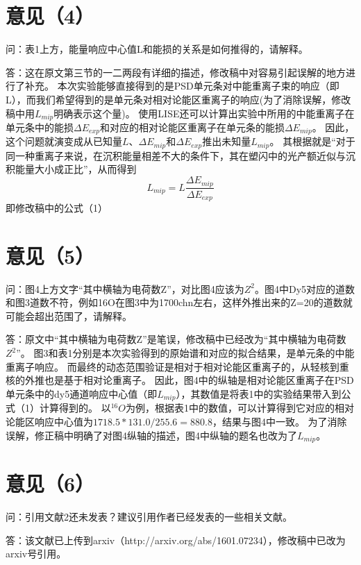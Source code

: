 \documentclass[UTF8]{ctexart}
\begin{document}
\section{意见（4）}
问：表1上方，能量响应中心值L和能损的关系是如何推得的，请解释。

答：这在原文第三节的一二两段有详细的描述，修改稿中对容易引起误解的地方进行了补充。
本次实验能够直接得到的是PSD单元条对中能重离子束的响应（即L），而我们希望得到的是单元条对相对论能区重离子的响应(为了消除误解，修改稿中用$L_{mip}$明确表示这个量)。
使用LISE还可以计算出实验中所用的中能重离子在单元条中的能损$\Delta E_{exp}$和对应的相对论能区重离子在单元条的能损$\Delta E_{mip}$。
因此，这个问题就演变成从已知量$L$、$\Delta E_{mip}$和$\Delta E_{exp}$推出未知量$L_{mip}$。
其根据就是“对于同一种重离子来说，在沉积能量相差不大的条件下，其在塑闪中的光产额近似与沉积能量大小成正比”，从而得到
\begin{equation}
L_{mip}=L\frac{\Delta E_{mip}}{\Delta E_{exp}}
\label{eq:correction}
\end{equation}
即修改稿中的公式（1）

\section{意见（5）}
问：图4上方文字“其中横轴为电荷数Z”，对比图4应该为$Z^2$。图4中Dy5对应的道数和图3道数不符，例如16O在图3中为1700chn左右，这样外推出来的Z=20的道数就可能会超出范围了，请解释。

答：原文中“其中横轴为电荷数Z”是笔误，修改稿中已经改为“其中横轴为电荷数$Z^2$”。
图3和表1分别是本次实验得到的原始谱和对应的拟合结果，是单元条的中能重离子响应。
而最终的动态范围验证是相对于相对论能区重离子的，从轻核到重核的外推也是基于相对论重离子。
因此，图4中的纵轴是相对论能区重离子在PSD单元条中的dy5通道响应中心值（即$L_{mip}$），其数值是将表1中的实验结果带入到公式（1）计算得到的。
以$^{16}O$为例，根据表1中的数值，可以计算得到它对应的相对论能区响应中心值为$1718.5*131.0/255.6=880.8$，结果与图4中一致。
为了消除误解，修正稿中明确了对图4纵轴的描述，图4中纵轴的题名也改为了$L_{mip}$。

\section{意见（6）}
问：引用文献2还未发表？建议引用作者已经发表的一些相关文献。

答：该文献已上传到arxiv（http://arxiv.org/abs/1601.07234），修改稿中已改为arxiv号引用。
\end{document}
